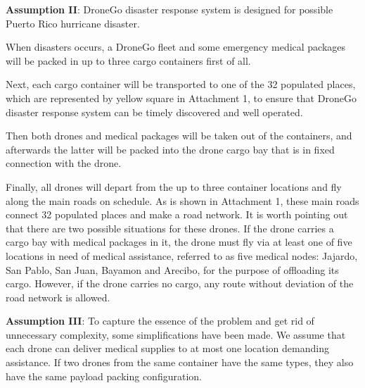 \documentclass{mcmthesis}
\begin{document}
\noindent\textbf{Assumption II}: DroneGo disaster response system is designed for possible Puerto Rico hurricane disaster. 

\noindent When disasters occurs, a DroneGo fleet and some emergency medical packages will be packed in up to three cargo containers first of all. 

\noindent Next, each cargo container will be transported to one of the 32 populated places, which are represented by yellow square in Attachment 1, to ensure that DroneGo disaster response system can be timely discovered and well operated. 

\noindent Then both drones and medical packages will be taken out of the containers, and afterwards the latter will be packed into the drone cargo bay that is in fixed connection with the drone. 

\noindent Finally, all drones will depart from the up to three container locations and fly along the main roads on schedule. As is shown in Attachment 1, these main roads connect 32 populated places and make a road network. It is worth pointing out that there are two possible situations for these drones. If the drone carries a cargo bay with medical packages in it, the drone must fly via at least one of five locations in need of medical assistance, referred to as five medical nodes: Jajardo, San Pablo, San Juan, Bayamon and Arecibo, for the purpose of offloading its cargo. However, if the drone carries no cargo, any route without deviation of the road network is allowed.

\noindent\textbf{Assumption III}: To capture the essence of the problem and get rid of unnecessary  complexity, some simplifications have been made. We assume that each drone can deliver medical supplies to at most one location demanding assistance. If two drones from the same container have the same types, they also have the same payload packing configuration.
\end{document}
